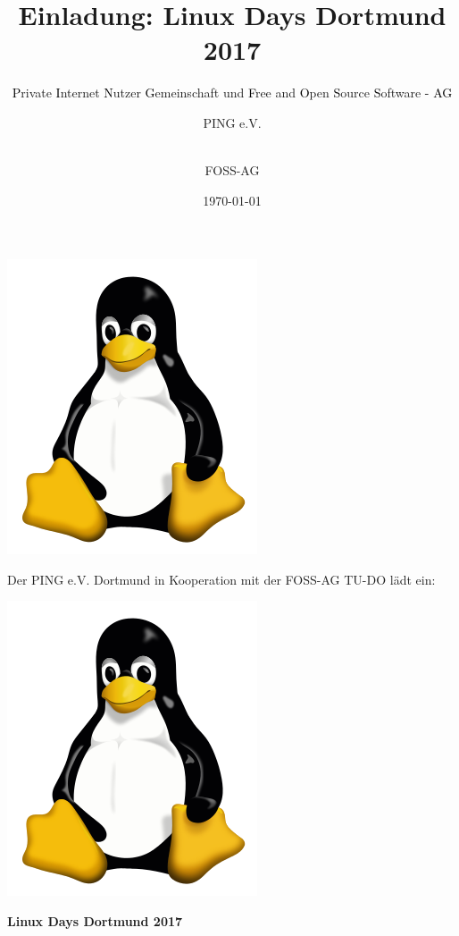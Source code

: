 \documentclass{beamer}
\author{
	PING e.V.
	\and \\
	FOSS-AG
}
\date{\today}
\title{Einladung: Linux Days Dortmund 2017}
\subtitle{\textcolor{black}{P}rivate \textcolor{black}{I}nternet \textcolor{black}{N}utzer \textcolor{black}{G}emeinschaft und \textcolor{black}{F}ree and \textcolor{black}{O}pen \textcolor{black}{S}ource \textcolor{black}{S}oftware \textcolor{black}{- AG}}
\begin{document}
	
	\begin{frame}
		\begin{center}
			\hspace{-0.9cm}\begin{minipage}{0.12\linewidth}
				\includegraphics[scale=0.1]{resources/tux}
			\end{minipage}
			\begin{minipage}{0.9\linewidth}
				{\scriptsize Der PING e.V. Dortmund in Kooperation mit der FOSS-AG TU-DO lädt ein:}
				\begin{minipage}{0.01\linewidth}
					\includegraphics[scale=0.1]{resources/tux}
				\end{minipage}
			\end{minipage}
			
			\vspace{0.2cm}
			{\large \textbf{Linux Days Dortmund 2017}}
		\end{center}
	

\end{frame}
\end{document}
